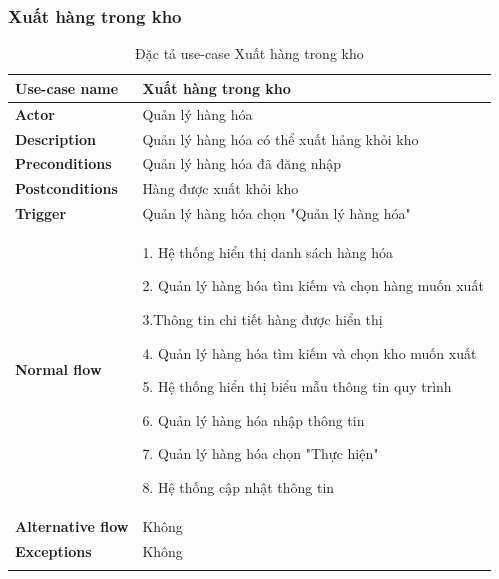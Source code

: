 \subsubsection{Xuất hàng trong kho}
{
    \setlength\extrarowheight{6pt}
    \begin{longtable}{| p{} | p{} |}
        \hline
        \textbf{Use-case name}
         &
        Xuất hàng trong kho
        \\
        \hline
        \textbf{Actor}
         &
        Quản lý hàng hóa
        \\
        \hline
        \textbf{Description}
         &
        Quản lý hàng hóa có thể xuất hảng khỏi kho
        \\
        \hline
        \textbf{Preconditions}
         &
        Quản lý hàng hóa đã đăng nhập
        \\
        \hline
        \textbf{Postconditions}
         &
        Hàng được xuất khỏi kho
        \\
        \hline
        \textbf{Trigger}
         &
        Quản lý hàng hóa chọn "Quản lý hàng hóa"
        \\
        \hline
        \begin{flushleft}
            \textbf{Normal flow}
        \end{flushleft}
         &
        1. Hệ thống hiển thị danh sách hàng hóa

        2. Quản lý hàng hóa tìm kiếm và chọn hàng muốn xuất

        3.Thông tin chi tiết hàng được hiển thị

        4. Quản lý hàng hóa tìm kiếm và chọn kho muốn xuất

        5. Hệ thống hiển thị biểu mẫu thông tin quy trình

        6. Quản lý hàng hóa nhập thông tin

        7. Quản lý hàng hóa chọn "Thực hiện"

        8. Hệ thống cập nhật thông tin
        \\
        \hline
        \textbf{Alternative flow}
         &
        Không
        \\
        \hline
        \textbf{Exceptions}
         &
        Không
        \\
        \hline
        \caption{Đặc tả use-case Xuất hàng trong kho}
    \end{longtable}
}


